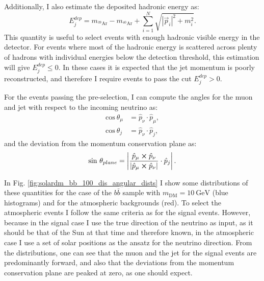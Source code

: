 Additionally, I also estimate the deposited hadronic energy as:
\begin{equation}
	E_{j}^{dep} = m_{^{39}\mathrm{Ar}} - m_{^{40}\mathrm{Ar}} + \sum_{i=1}^{N} \sqrt{|\vec{p}_{i}|^{2} + m_{i}^{2}}.
\end{equation}
This quantity is useful to select events with enough hadronic visible energy in the detector. For events where most of the hadronic energy is scattered across plenty of hadrons with individual energies below the detection threshold, this estimation will give $E_{j}^{dep} \leq 0$. In these cases it is expected that the jet momentum is poorly reconstructed, and therefore I require events to pass the cut $E_{j}^{dep} > 0$.

For the events passing the pre-selection, I can compute the angles for the muon and jet with respect to the incoming neutrino as:
\begin{align}
	\mathrm{cos} \ \theta_{\mu} &= \hat{p}_{\nu} \cdot \hat{p}_{\mu},\\
	\mathrm{cos} \ \theta_{j} &= \hat{p}_{\nu} \cdot \hat{p}_{j},
\end{align}
and the deviation from the momentum conservation plane as:
\begin{equation}
	\mathrm{sin} \ \theta_{plane} = \left|\frac{\hat{p}_{\mu} \cross \hat{p}_{\nu}}{|\hat{p}_{\mu} \cross \hat{p}_{\nu}|} \cdot \hat{p}_{j}\right|.
\end{equation}

In Fig. \ref{fig:solardm_bb_100_dis_angular_dists} I show some distributions of these quantities for the case of the $b\bar{b}$ sample with $m_{\mathrm{DM}} = 10 \ \mathrm{GeV}$ (blue histograms) and for the atmospheric backgrounds (red). To select the atmospheric events I follow the same criteria as for the signal events. However, because in the signal case I use the true direction of the neutrino as input, as it should be that of the Sun at that time and therefore known, in the atmospheric case I use a set of solar positions as the ansatz for the neutrino direction. From the distributions, one can see that the muon and the jet for the signal events are predominantly forward, and also that the deviations from the momentum conservation plane are peaked at zero, as one should expect.

